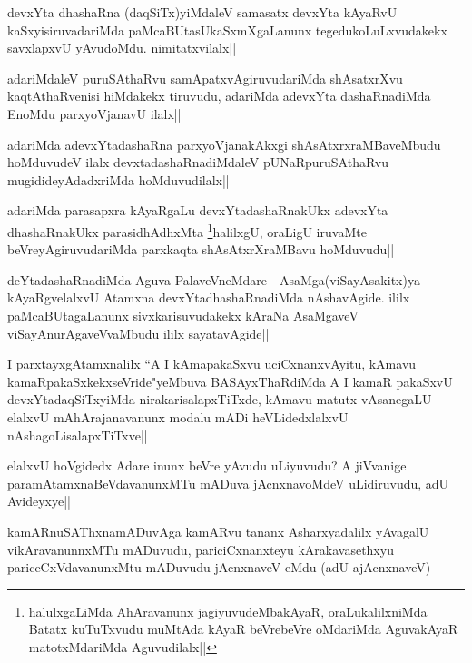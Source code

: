 
\begin{artha}
devxYta dhashaRna (daqSiTx)yiMdaleV samasatx devxYta kAyaRvU kaSxyisiruvadariMda paMcaBUtasUkaSxmXgaLanunx tegedukoLuLxvudakekx savxlapxvU yAvudoMdu. nimitatxvilalx||
\end{artha}

\begin{artha}
adariMdaleV puruSAthaRvu samApatxvAgiruvudariMda shAsatxrXvu kaqtAthaRvenisi hiMdakekx tiruvudu, adariMda adevxYta dashaRnadiMda EnoMdu parxyoVjanavU ilalx||
\end{artha}

\begin{artha}
adariMda adevxYtadashaRna parxyoVjanakAkxgi shAsAtxrxraMBaveMbudu hoMduvudeV ilalx devxtadashaRnadiMdaleV pUNaRpuruSAthaRvu mugidideyAdadxriMda hoMduvudilalx||
\end{artha}

\begin{artha}
adariMda parasapxra kAyaRgaLu devxYtadashaRnakUkx adevxYta dhashaRnakUkx parasidhAdhxMta 
\footnote{halulxgaLiMda AhAravanunx jagiyuvudeMbakAyaR, oraLukalilxniMda Batatx kuTuTxvudu muMtAda kAyaR beVrebeVre oMdariMda AguvakAyaR matotxMdariMda Aguvudilalx||}halilxgU, oraLigU iruvaMte beVreyAgiruvudariMda parxkaqta shAsAtxrXraMBavu hoMduvudu||
\end{artha}

\begin{artha}
deYtadashaRnadiMda Aguva PalaveVneMdare - AsaMga(viSayAsakitx)ya kAyaRgvelalxvU Atamxna  devxYtadhashaRnadiMda nAshavAgide. ililx paMcaBUtagaLanunx sivxkarisuvudakekx kAraNa AsaMgaveV viSayAnurAgaveVvaMbudu ililx sayatavAgide||
\end{artha}

\begin{artha}
I parxtayxgAtamxnalilx ``A I kAmapakaSxvu uciCxnanxvAyitu, kAmavu kamaRpakaSxkekxseVride"yeMbuva BASAyxThaRdiMda A I kamaR pakaSxvU devxYtadaqSiTxyiMda nirakarisalapxTiTxde, kAmavu matutx vAsanegaLU elalxvU mAhArajanavanunx modalu mADi heVLidedxlalxvU nAshagoLisalapxTiTxve||
\end{artha}

\begin{artha}
elalxvU hoVgidedx Adare inunx beVre yAvudu uLiyuvudu? A jiVvanige paramAtamxnaBeVdavanunxMTu  mADuva jAcnxnavoMdeV uLidiruvudu, adU Avideyxye||
\end{artha}

\begin{artha}
kamARnuSAThxnamADuvAga kamARvu tananx Asharxyadalilx yAvagalU vikAravanunnxMTu mADuvudu, pariciCxnanxteyu kArakavasethxyu pariceCxVdavanunxMtu mADuvudu jAcnxnaveV eMdu (adU ajAcnxnaveV)
\end{artha}

